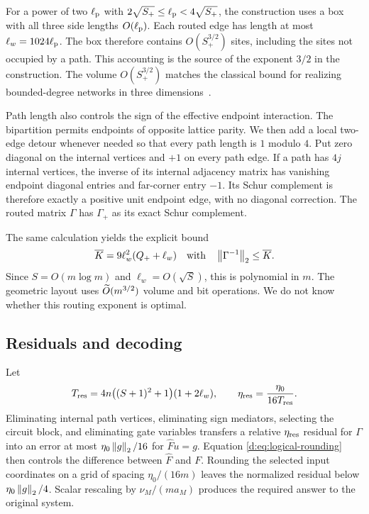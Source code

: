 For a power of two $\ell_{\rm p}$ with $2\sqrt{S_+}\le\ell_{\rm p}<4\sqrt{S_+}$, the construction
uses a box with all three side lengths $O(\ell_{\rm p})$. Each routed edge has length
at most $\ell_w=1024\ell_{\rm p}$. The box therefore contains $O(S_+^{3/2})$ sites,
including the sites not occupied by a path. This accounting is the source
of the exponent $3/2$ in the construction. The volume $O(S_+^{3/2})$
matches the classical bound for realizing bounded-degree networks in
three dimensions~\citep{KolmogorovBarzdin1967,LeightonRosenberg1986}.

Path length also controls the sign of the effective endpoint interaction.
The bipartition permits endpoints of opposite lattice parity. We then add
a local two-edge detour whenever needed so that every path length is
$1$ modulo $4$. Put zero diagonal on the internal vertices and $+1$ on
every path edge. If a path has $4j$ internal vertices, the inverse of its
internal adjacency matrix has vanishing endpoint diagonal entries and
far-corner entry $-1$. Its Schur complement is therefore exactly a
positive unit endpoint edge, with no diagonal correction. The routed
matrix $\Gamma$ has $\Gamma_+$ as its exact Schur complement.

The same calculation yields the explicit bound
\begin{equation}
 \overline K=9\ell_w^2(Q_++\ell_w)
 \quad\text{with}\quad
 \left\lVert \Gamma^{-1}\right\rVert_2\le\overline K.
 \label{d:eq:logical-final-inverse}
\end{equation}
Since $S=O(m\log m)$ and $\ell_w=O(\sqrt S)$, this is polynomial in $m$.
The geometric layout uses $\widetilde O(m^{3/2})$ volume and bit operations.
We do not know whether this routing exponent is optimal.

\subsection{Residuals and decoding}

Let
\begin{equation}
 T_{\rm res}=4n\bigl((S+1)^2+1\bigr)(1+2\ell_w),
 \qquad \eta_{\rm res}=\frac{\eta_0}{16T_{\rm res}}.
 \label{d:eq:logical-tolerance}
\end{equation}
Eliminating internal path vertices, eliminating sign mediators, selecting
the circuit block, and eliminating gate variables transfers a relative
$\eta_{\rm res}$ residual for $\Gamma$ into an error at most
$\eta_0\left\lVert g\right\rVert_2/16$ for $\widehat F u=g$. Equation
\eqref{d:eq:logical-rounding} then controls the difference between
$\widehat F$ and $F$. Rounding the selected input coordinates on a grid
of spacing $\eta_0/(16m)$ leaves the normalized residual below
$\eta_0\left\lVert g\right\rVert_2/4$. Scalar rescaling by $\nu_M/(ma_M)$ produces the
required answer to the original system.

